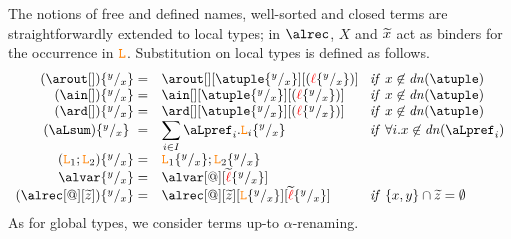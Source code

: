 The notions of free and defined names, well-sorted and closed terms
are straightforwardly extended to local types; in $\alrec$, 
 $X$ and $\widetilde{x}$ act as binders for the occurrence in $\texttt{\textcolor{orange}L}$.
%
%
%
Substitution on local types is defined as follows. 
\[
\begin{array}{rl@{\hspace{.3cm}}l}
  (\arout[]) \sust x y  = &  \arout[][\atuple\sust x y][(\alocvar\sust x y)] &  {\it if}\  x\not\in\dn\atuple
  \\
  (\ain[]) \sust x y  = &  \ain[][\atuple\sust x y][(\alocvar\sust x y)] &  {\it if}\  x\not\in\dn\atuple
  \\
  (\ard[]) \sust x y  = &  \ard[][\atuple\sust x y][(\alocvar\sust x y)] &  {\it if}\  x\not\in\dn\atuple
  \\
   (\aLsum)\sust x y  = & \displaystyle{\sum_{i\in I} {{\aLpref_{i}.\aL_{i}}\sust x y}}
   &  {\it if}\  \forall i. x\not\in\dn{\aLpref_i}
  \\
  (\aL_1;\aL_2)\sust x y  = &  \aL_1\sust x y;  \aL_2\sust x y 
  \\
  \alvar\sust x y  = & \alvar[@][\seq\alocvar\sust x y]  
  \\
  (\alrec[@][\seq z])\sust x y  = & \alrec[@][\seq z][\aL\sust x y][\seq\alocvar\sust x y] &  {\it if}\  \{x,y\}\cap\seq z = \emptyset
\end{array}
\]
%
%
%
%
%
As for global types, we consider terms up-to $\alpha$-renaming.
 
